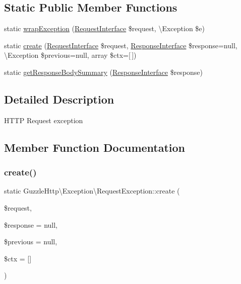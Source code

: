 \subsection*{Static Public Member Functions}
\begin{DoxyCompactItemize}
\item 
static \hyperlink{classGuzzleHttp_1_1Exception_1_1RequestException_a8a655eb5c687e8cd40669cca7f69a376}{wrap\+Exception} (\hyperlink{interfacePsr_1_1Http_1_1Message_1_1RequestInterface}{Request\+Interface} \$request, \textbackslash{}Exception \$e)
\item 
static \hyperlink{classGuzzleHttp_1_1Exception_1_1RequestException_a0be3a3bc293b2453c14f7dcb93f9ad38}{create} (\hyperlink{interfacePsr_1_1Http_1_1Message_1_1RequestInterface}{Request\+Interface} \$request, \hyperlink{interfacePsr_1_1Http_1_1Message_1_1ResponseInterface}{Response\+Interface} \$response=null, \textbackslash{}Exception \$previous=null, array \$ctx=\mbox{[}$\,$\mbox{]})
\item 
static \hyperlink{classGuzzleHttp_1_1Exception_1_1RequestException_a6aa968b8fd113ceb2b67896ac08139ab}{get\+Response\+Body\+Summary} (\hyperlink{interfacePsr_1_1Http_1_1Message_1_1ResponseInterface}{Response\+Interface} \$response)
\end{DoxyCompactItemize}


\subsection{Detailed Description}
H\+T\+TP Request exception 

\subsection{Member Function Documentation}
\mbox{\label{classGuzzleHttp_1_1Exception_1_1RequestException_a0be3a3bc293b2453c14f7dcb93f9ad38}} 
\subsubsection{\texorpdfstring{create()}{create()}}
{\footnotesize\ttfamily static Guzzle\+Http\textbackslash{}\+Exception\textbackslash{}\+Request\+Exception\+::create (\begin{DoxyParamCaption}\item[{\hyperlink{interfacePsr_1_1Http_1_1Message_1_1RequestInterface}{Request\+Interface}}]{\$request,  }\item[{\hyperlink{interfacePsr_1_1Http_1_1Message_1_1ResponseInterface}{Response\+Interface}}]{\$response = {\ttfamily null},  }\item[{\textbackslash{}Exception}]{\$previous = {\ttfamily null},  }\item[{array}]{\$ctx = {\ttfamily \mbox{[}\mbox{]}} }\end{DoxyParamCaption})\hspace{0.3cm}{\ttfamily [static]}}


